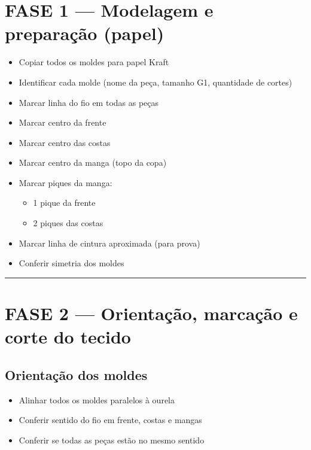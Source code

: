 \documentclass[
  brazilian,
  8pt,
  oneside]{book}
\providecommand{\tightlist}{%
  \setlength{\itemsep}{0pt}\setlength{\parskip}{0pt}}
\begin{document}
\section{FASE 1 --- Modelagem e preparação (papel)}\label{fase-1-modelagem-e-preparauxe7uxe3o-papel}

\begin{itemize}
\tightlist
\item[$\square$]
  Copiar todos os moldes para papel Kraft
\item[$\square$]
  Identificar cada molde (nome da peça, tamanho G1, quantidade de cortes)
\item[$\square$]
  Marcar linha do fio em todas as peças
\item[$\square$]
  Marcar centro da frente
\item[$\square$]
  Marcar centro das costas
\item[$\square$]
  Marcar centro da manga (topo da copa)
\item[$\square$]
  Marcar piques da manga:

  \begin{itemize}
  \tightlist
  \item[$\square$]
    1 pique da frente
  \item[$\square$]
    2 piques das costas
  \end{itemize}
\item[$\square$]
  Marcar linha de cintura aproximada (para prova)
\item[$\square$]
  Conferir simetria dos moldes
\end{itemize}

\begin{center}\rule{0.5\linewidth}{0.5pt}\end{center}

\section{FASE 2 --- Orientação, marcação e corte do tecido}\label{fase-2-orientauxe7uxe3o-marcauxe7uxe3o-e-corte-do-tecido}

\subsection{Orientação dos moldes}\label{orientauxe7uxe3o-dos-moldes}

\begin{itemize}
\tightlist
\item[$\square$]
  Alinhar todos os moldes paralelos à ourela
\item[$\square$]
  Conferir sentido do fio em frente, costas e mangas
\item[$\square$]
  Conferir se todas as peças estão no mesmo sentido
\end{itemize}
\end{document}
